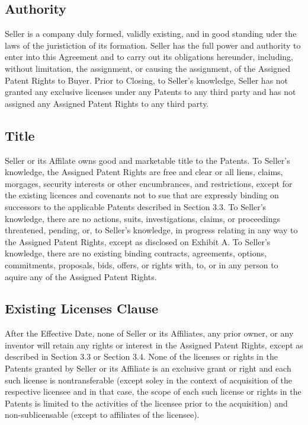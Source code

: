 \documentclass[letterpaper,10pt,openany,oneside,english]{sphinxmanual}
\begin{document}
\subsection{Authority}
\label{\detokenize{6-representations:authority}}
Seller is a company duly formed, validly existing, and in good standing uder the laws of the juristiction of its formation. Seller has the full power and authority to enter into this Agreement and to carry out its obligations hereunder, including, without limitation, the assignment, or causing the assignment, of the Assigned Patent Rights to Buyer. Prior to Closing, to Seller’s knowledge, Seller has not granted any exclusive licenses under any Patents to any third party and has not assigned any Assigned Patent Rights to any third party.


\subsection{Title}
\label{\detokenize{6-representations:title}}
Seller or its Affilate owns good and marketable title to the Patents. To Seller’s knowledge, the Assigned Patent Rights are free and clear or all liens, claims, morgages, security interests or other encumbrances, and restrictions, except for the existing licences and covenants not to sue that are expressly binding on successors to the applicable Patents described in Section 3.3. To Seller’s knowledge, there are no actions, suits, investigations, claims, or proceedings threatened, pending, or, to Seller’s knowledge, in progress relating in any way to the Assigned Patent Rights, except as disclosed on Exhibit A. To Seller’s knowledge, there are no existing binding contracts, agreements, options, commitments, proposals, bids, offers, or rights with, to, or in any person to aquire any of the Assigned Patent Rights.


\subsection{Existing Licenses Clause}
\label{\detokenize{6-representations:existing-licenses-clause}}
After the Effective Date, none of Seller or its Affiliates, any prior owner, or any inventor will retain any rights or interest in the Assigned Patent Rights, except as described in Section 3.3 or Section 3.4. None of the licenses or rights in the Patents granted by Seller or its Affiliate is an exclusive grant or right and each such license is nontransferable (except soley in the context of acquisition of the respective licensee and in that case, the scope of each such license or rights in the Patents is limited to the activities of the licensee prior to the acquisition) and non-sublicensable (except to affiliates of the licensee).
\end{document}
